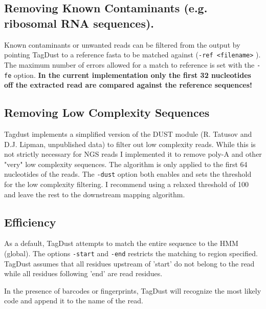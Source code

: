 \documentclass[11pt,a4paper,oneside]{book}
\begin{document}
\subsection{Removing Known Contaminants (e.g. ribosomal RNA sequences).}
Known contaminants or unwanted reads can be filtered from the output by pointing TagDust to a reference fasta to be matched against ({\tt -ref <filename>} ). The maximum number of errors allowed for a match to reference is set with the {\tt -fe} option. {\bf In the current implementation only the first 32 nucleotides off the extracted read are compared against the reference sequences!}
\subsection{Removing Low Complexity Sequences}
Tagdust implements a simplified version of the DUST module (R. Tatusov and D.J. Lipman, unpublished data) to filter out low complexity reads. While this is not strictly necessary for NGS reads I implemented it to remove poly-A and other "very" low complexity sequences. The algorithm is only applied to the first 64 nucleotides of the reads. The {\tt -dust} option both enables and sets the threshold for the low complexity filtering. I recommend using a relaxed threshold of 100 and leave the rest to the downstream mapping algorithm. 


\subsection{Efficiency}
As a default, TagDust attempts to match the entire sequence to the HMM (global). The options {\tt -start} and {\tt -end} restricts the matching to region specified. TagDust assumes that all residues upstream of 'start' do not belong to the read while all residues following 'end' are read residues.

In the presence of barcodes or fingerprints, TagDust will recognize the most likely code and append it to the name of the read. 


\end{document}
